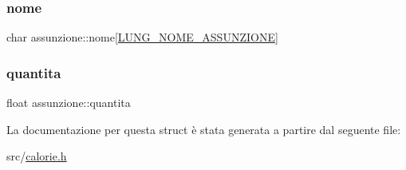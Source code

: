 \mbox{\label{structassunzione_aff7debc5c0b0bf1772b538eebc66c095}} 
\subsubsection{\texorpdfstring{nome}{nome}}
{\footnotesize\ttfamily char assunzione\+::nome\mbox{[}\hyperlink{calorie_8h_a88b0ffe468e9084f35b1c67962e6627c}{L\+U\+N\+G\+\_\+\+N\+O\+M\+E\+\_\+\+A\+S\+S\+U\+N\+Z\+I\+O\+NE}\mbox{]}}

\mbox{\label{structassunzione_ace2bbe92494045f3b34d4f2ef5c4e8db}} 
\subsubsection{\texorpdfstring{quantita}{quantita}}
{\footnotesize\ttfamily float assunzione\+::quantita}



La documentazione per questa struct è stata generata a partire dal seguente file\+:\begin{DoxyCompactItemize}
\item 
src/\hyperlink{calorie_8h}{calorie.\+h}\end{DoxyCompactItemize}
